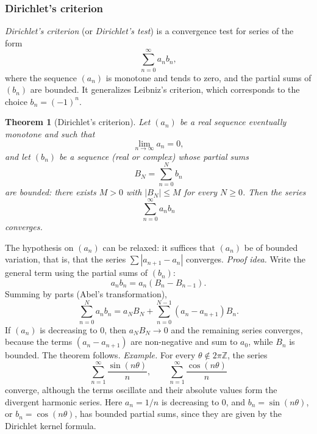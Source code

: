 \documentclass[11pt,a4paper]{article}
\theoremstyle{definition} \newtheorem{definition}{Definition} \theoremstyle{plain} \newtheorem{theorem}{Theorem}
\begin{document}
\subsubsection{Dirichlet's criterion}
\emph{Dirichlet's criterion} (or \emph{Dirichlet's test}) is a convergence test for series of the form
\[ \sum_{n=0}^{\infty} a_n b_n, \]
where the sequence $(a_n)$ is monotone and tends to zero, and the partial sums of $(b_n)$ are bounded. It generalizes Leibniz's criterion, which corresponds to the choice $b_n = (-1)^n$.
\begin{theorem}[Dirichlet's criterion]\label{thm:dirichlet} Let $(a_n)$ be a real sequence eventually monotone and such that
\[ \lim_{n\to\infty} a_n = 0, \]
and let $(b_n)$ be a sequence (real or complex) whose partial sums
\[ B_N = \sum_{n=0}^{N} b_n \]
are bounded: there exists $M>0$ with $|B_N|\le M$ for every $N\ge 0$.
Then the series
\[ \sum_{n=0}^{\infty} a_n b_n \]
converges. \end{theorem}
The hypothesis on $(a_n)$ can be relaxed: it suffices that $(a_n)$ be of bounded variation, that is, that the series $\sum |a_{n+1}-a_n|$ converges.
\emph{Proof idea.}
Write the general term using the partial sums of $(b_n)$:
\[ a_n b_n = a_n (B_n - B_{n-1}). \]
Summing by parts (Abel's transformation),
\[ \sum_{n=0}^{N} a_n b_n = a_N B_N + \sum_{n=0}^{N-1} (a_n - a_{n+1}) B_n. \]
If $(a_n)$ is decreasing to $0$, then $a_N B_N\to 0$ and the remaining series converges, because the terms $(a_n - a_{n+1})$ are non-negative and sum to $a_0$, while $B_n$ is bounded.
The theorem follows.
\emph{Example.} For every $\theta\notin 2\pi\mathbb{Z}$, the series
\[ \sum_{n=1}^{\infty} \frac{\sin(n\theta)}{n}, \qquad \sum_{n=1}^{\infty} \frac{\cos(n\theta)}{n} \]
converge, although the terms oscillate and their absolute values form the divergent harmonic series.
Here $a_n = 1/n$ is decreasing to $0$, and $b_n = \sin(n\theta)$, or $b_n = \cos(n\theta)$, has bounded partial sums, since they are given by the Dirichlet kernel formula.
\clearpage
\end{document}
